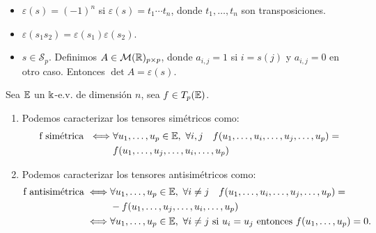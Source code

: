 \begin{obs}
    \begin{itemize}
        \item $\varepsilon (s) = (-1)^n$ si $\varepsilon (s) = t_1 \cdots t_n$, donde
        $t_1,\dots,t_n$ son transposiciones.
        \item $\varepsilon (s_1 s_2) = \varepsilon (s_1) \varepsilon(s_2)$.
        \item $s \in \mathcal{S}_p$. Definimos $A \in \mathcal{M}(\mathbb{R})_{p\times p}$, donde
        $a_{i,j} = 1$ si $i = s(j)$ y $a_{i,j} = 0$ en otro caso. Entonces
        $\det A = \varepsilon(s)$.
    \end{itemize}
\end{obs}
\begin{prop}\label{prop:sim_comp}
    Sea $\mathbb{E}$ un $\Bbbk$-e.v. de dimensión $n$, sea $f \in T_p(\mathbb{E})$.
    \begin{enumerate}
        \item Podemos caracterizar los tensores simétricos como:
        \[
        \begin{split}\text{f simétrica } \iff &
        \forall u_1,\dots,u_p \in \mathbb{E}, \  \forall i,j \quad
        f(u_1,\dots,u_i,\dots,u_j,\dots,u_p) = \\
        &f(u_1,\dots,u_j,\dots,u_i,\dots,u_p)
        \end{split}
        \]
        \item Podemos caracterizar los tensores antisimétricos como:
        \[
        \begin{split}\text{f antisimétrica} \iff &
        \forall u_1,\dots,u_p \in \mathbb{E}, \  \forall i \neq j \quad
        f(u_1,\dots,u_i,\dots,u_j,\dots,u_p) = \\
        &-f(u_1,\dots,u_j,\dots,u_i,\dots,u_p)\\
        \iff& \forall u_1,\dots,u_p \in \mathbb{E}, \ \forall i \neq j \text{ si } u_i=u_j
        \text{ entonces } f(u_1,\dots,u_p) = 0.
        \end{split}\]
    \end{enumerate}
\end{prop}
